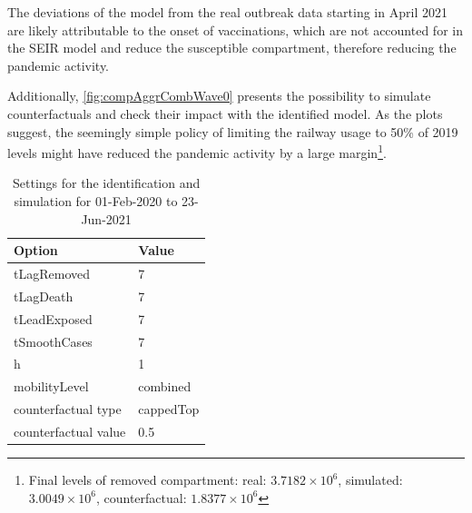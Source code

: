  The deviations of the model from the real outbreak data starting in April 2021 are likely attributable to the onset of vaccinations, which are not accounted for in the SEIR model and reduce the susceptible compartment, therefore reducing the pandemic activity.

Additionally, \autoref{fig:compAggrCombWave0} presents the possibility to simulate counterfactuals and check their impact with the identified model. As the plots suggest, the seemingly simple policy of limiting the railway usage to 50\% of 2019 levels might have reduced the pandemic activity by a large margin\footnote{Final levels of removed compartment: real: $3.7182{\times} 10^6$, simulated: $3.0049{\times} 10^6$, counterfactual: $1.8377{\times} 10^6$}.

\begin{table}[h]
     \centering
     \caption{Settings for the identification and simulation for 01-Feb-2020 to 23-Jun-2021}
     \begin{tabular*}{.75\linewidth}{l||l}
     Option & Value \\
     \hline
     \hline
     tLagRemoved & 7\\
     tLagDeath & 7\\
     tLeadExposed & 7\footnotemark\\
     tSmoothCases & 7\\
     h & 1\\
     mobilityLevel & combined\\
     counterfactual type & cappedTop\\
     counterfactual value & 0.5\\
     \hline
     \end{tabular*}
     \label{tbl:seirSettings}
\end{table}

